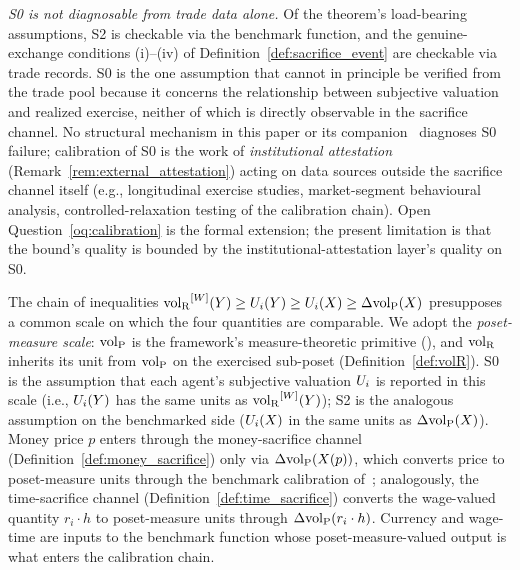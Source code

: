 \begin{remark}
\emph{S0 is not diagnosable from trade data alone.}  Of the
theorem's load-bearing assumptions, S2 is checkable via the
benchmark function, and the genuine-exchange conditions (i)--(iv)
of Definition~\ref{def:sacrifice_event} are checkable
via trade records.  S0 is the
one assumption that cannot in principle be verified from the
trade pool because it concerns the relationship between
subjective valuation and realized exercise, neither of which
is directly observable in the sacrifice channel.  No
structural mechanism in this paper or its
companion~\citep[Need~Sufficiency]{lasser2026paper8b} diagnoses S0
failure; calibration of S0 is the work of
\emph{institutional attestation}
(Remark~\ref{rem:external_attestation}) acting on data sources
outside the sacrifice channel itself (e.g., longitudinal
exercise studies, market-segment behavioural analysis,
controlled-relaxation testing of the calibration chain). Open
Question~\ref{oq:calibration} is the formal extension; the
present limitation is that the bound's quality is bounded by
the institutional-attestation layer's quality on S0.
\end{remark}

\begin{remark}
\label{rem:units}
The chain of inequalities ${\operatorname{vol}_{\mathrm{R}}}^{[W]}(Y) \geq U_i(Y) \geq U_i(X)
\geq \Delta{\operatorname{vol}_{\mathrm{P}}}(X)$ presupposes a common scale on which the four
quantities are comparable.  We adopt the \emph{poset-measure
scale}: ${\operatorname{vol}_{\mathrm{P}}}$ is the framework's measure-theoretic primitive
(\citep[Proposition~1]{lasser2026poset}), and ${\operatorname{vol}_{\mathrm{R}}}$ inherits its
unit from ${\operatorname{vol}_{\mathrm{P}}}$ on the exercised sub-poset
(Definition~\ref{def:volR}).  S0 is the assumption that each
agent's subjective valuation $U_i$ is reported in this scale (i.e.,
$U_i(Y)$ has the same units as ${\operatorname{vol}_{\mathrm{R}}}^{[W]}(Y)$); S2 is the
analogous assumption on the benchmarked side ($U_i(X)$ in the
same units as $\Delta{\operatorname{vol}_{\mathrm{P}}}(X)$).  Money price $p$ enters through
the money-sacrifice channel
(Definition~\ref{def:money_sacrifice}) only via
$\Delta{\operatorname{vol}_{\mathrm{P}}}(X(p))$, which converts price to poset-measure units
through the benchmark calibration of~\citep[Definition~2]{lasser2026poset};
analogously, the time-sacrifice channel
(Definition~\ref{def:time_sacrifice}) converts the wage-valued
quantity $r_i \cdot h$ to poset-measure units through
$\Delta{\operatorname{vol}_{\mathrm{P}}}(r_i \cdot h)$.  Currency and wage-time are inputs
to the benchmark function whose poset-measure-valued output is
what enters the calibration chain.
\end{remark}

